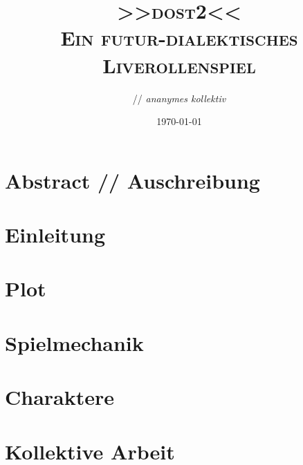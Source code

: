 \documentclass[12pt, a4paper, openany]{book}
\title{
  { \Large 
    \textbf{\textsc{>>\acs{dost2}<<}}\\
  }
  \vspace{0.4cm}
  { \large \color{gray}
    \textsc{Ein futur-dialektisches Liverollenspiel}
  }
}
\author{\creators // \emph{ananymes kollektiv}}
\date{{\small \today}}
\begin{document}
\frontmatter

\begingroup
  \hypersetup{hidelinks}
  \maketitle
\endgroup

\chapter*{Abstract // Auschreibung}


\begingroup
  \hypersetup{hidelinks}
  \tableofcontents
\endgroup



\mainmatter
\chapter{Einleitung}


\chapter{Plot}


\chapter{Spielmechanik}


\chapter{Charaktere}


\chapter{Kollektive Arbeit}

\end{document}
